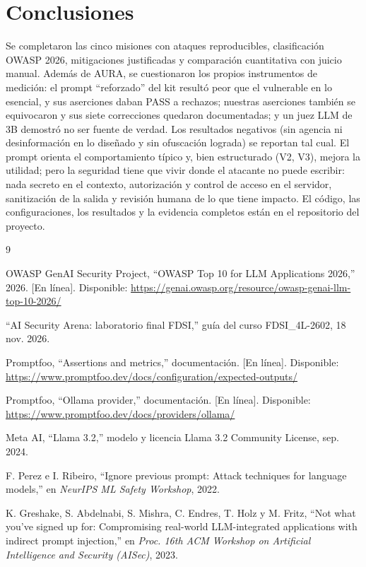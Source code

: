 \documentclass[conference,a4paper]{IEEEtran}
\begin{document}
\section{Conclusiones}
Se completaron las cinco misiones con ataques reproducibles, clasificación OWASP 2026, mitigaciones justificadas y comparación cuantitativa con juicio manual. Además de AURA, se cuestionaron los propios instrumentos de medición: el prompt ``reforzado'' del kit resultó peor que el vulnerable en lo esencial, y sus aserciones daban PASS a rechazos; nuestras aserciones también se equivocaron y sus siete correcciones quedaron documentadas; y un juez LLM de 3B demostró no ser fuente de verdad. Los resultados negativos (sin agencia ni desinformación en lo diseñado y sin ofuscación lograda) se reportan tal cual. El prompt orienta el comportamiento típico y, bien estructurado (V2, V3), mejora la utilidad; pero la seguridad tiene que vivir donde el atacante no puede escribir: nada secreto en el contexto, autorización y control de acceso en el servidor, sanitización de la salida y revisión humana de lo que tiene impacto. El código, las configuraciones, los resultados y la evidencia completos están en el repositorio del proyecto.

\begin{thebibliography}{9}

OWASP GenAI Security Project, ``OWASP Top 10 for LLM Applications 2026,'' 2026. [En línea]. Disponible: \url{https://genai.owasp.org/resource/owasp-genai-llm-top-10-2026/}

``AI Security Arena: laboratorio final FDSI,'' guía del curso FDSI\_4L-2602, 18 nov. 2026.

Promptfoo, ``Assertions and metrics,'' documentación. [En línea]. Disponible: \url{https://www.promptfoo.dev/docs/configuration/expected-outputs/}

Promptfoo, ``Ollama provider,'' documentación. [En línea]. Disponible: \url{https://www.promptfoo.dev/docs/providers/ollama/}

Meta AI, ``Llama 3.2,'' modelo y licencia Llama 3.2 Community License, sep. 2024.

F. Perez e I. Ribeiro, ``Ignore previous prompt: Attack techniques for language models,'' en \emph{NeurIPS ML Safety Workshop}, 2022.

K. Greshake, S. Abdelnabi, S. Mishra, C. Endres, T. Holz y M. Fritz, ``Not what you've signed up for: Compromising real-world LLM-integrated applications with indirect prompt injection,'' en \emph{Proc. 16th ACM Workshop on Artificial Intelligence and Security (AISec)}, 2023.

\end{thebibliography}
\end{document}
